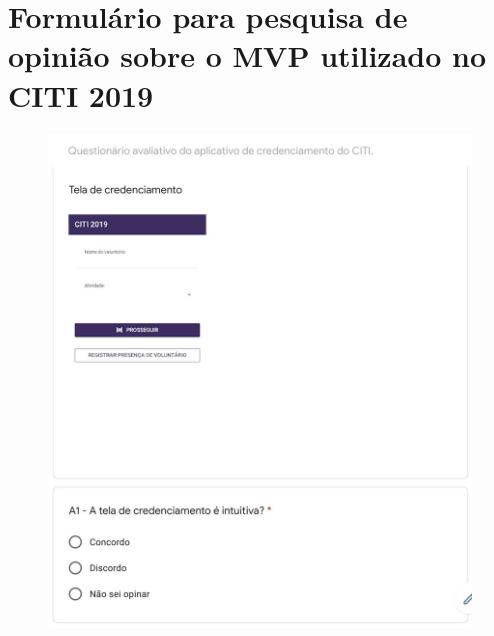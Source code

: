 \chapter{Formulário para pesquisa de opinião sobre o MVP utilizado no CITI 2019}\label{apendice1}

\begin{figure}[H]
    \centering
    \includegraphics[scale=0.35]{figuras/questionario1.jpg}
\end{figure}

